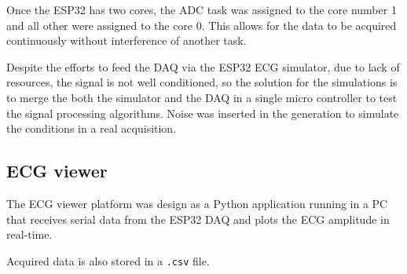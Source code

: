 Once the ESP32 has two cores, the ADC task was assigned to the core number 1 and all other were assigned to the core 0. This allows for the data to be acquired continuously without interference of another task.

Despite the efforts to feed the DAQ via the ESP32 ECG simulator, due to lack of resources, the signal is not well conditioned, so the solution for the simulations is to merge the both the simulator and the DAQ in a single micro controller to test the signal processing algorithms. Noise was inserted in the generation to simulate the conditions in a real acquisition.

\subsection{ECG viewer}

The ECG viewer platform was design as a Python application running in a PC that receives serial data from the ESP32 DAQ and plots the ECG amplitude in real-time.

Acquired data is also stored in a \texttt{.csv} file.

\pagebreak